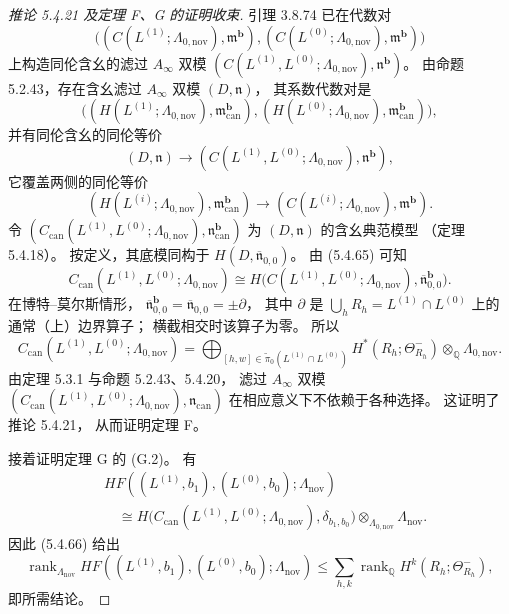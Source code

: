 \begin{proof}[推论 5.4.21 及定理 F、G 的证明收束]
引理 3.8.74 已在代数对
\[
\bigl(
(C(L^{(1)};\Lambda_{0,\mathrm{nov}}),
\mathfrak m^{\mathbf b}),
(C(L^{(0)};\Lambda_{0,\mathrm{nov}}),
\mathfrak m^{\mathbf b})
\bigr)
\]
上构造同伦含幺的滤过 $A_\infty$ 双模
$(C(L^{(1)},L^{(0)};\Lambda_{0,\mathrm{nov}}),
\mathfrak n^{\mathbf b})$。
由命题 5.2.43，存在含幺滤过
$A_\infty$ 双模 $(D,\mathfrak n)$，
其系数代数对是
\[
\bigl(
(H(L^{(1)};\Lambda_{0,\mathrm{nov}}),
\mathfrak m_{\mathrm{can}}^{\mathbf b}),
(H(L^{(0)};\Lambda_{0,\mathrm{nov}}),
\mathfrak m_{\mathrm{can}}^{\mathbf b})
\bigr),
\]
并有同伦含幺的同伦等价
\begin{equation}
(D,\mathfrak n)
\longrightarrow
(C(L^{(1)},L^{(0)};\Lambda_{0,\mathrm{nov}}),
\mathfrak n^{\mathbf b}),
\tag{5.4.65}\label{eq:5-4-65}
\end{equation}
它覆盖两侧的同伦等价
\[
(H(L^{(i)};\Lambda_{0,\mathrm{nov}}),
\mathfrak m_{\mathrm{can}}^{\mathbf b})
\longrightarrow
(C(L^{(i)};\Lambda_{0,\mathrm{nov}}),
\mathfrak m^{\mathbf b}).
\]
令
$(C_{\mathrm{can}}(L^{(1)},L^{(0)};
\Lambda_{0,\mathrm{nov}}),
\mathfrak n_{\mathrm{can}}^{\mathbf b})$
为 $(D,\mathfrak n)$ 的含幺典范模型
（定理 5.4.18）。
按定义，其底模同构于
$H(D,\overline{\mathfrak n}_{0,0})$。
由 (5.4.65) 可知
\[
C_{\mathrm{can}}(L^{(1)},L^{(0)};
\Lambda_{0,\mathrm{nov}})
\cong
H\bigl(
C(L^{(1)},L^{(0)};\Lambda_{0,\mathrm{nov}}),
\overline{\mathfrak n}_{0,0}^{\mathbf b}
\bigr).
\]
在博特--莫尔斯情形，
$\overline{\mathfrak n}_{0,0}^{\mathbf b}
=\overline{\mathfrak n}_{0,0}
=\pm\partial$，
其中 $\partial$ 是
$\bigcup_hR_h=L^{(1)}\cap L^{(0)}$
上的通常（上）边界算子；
横截相交时该算子为零。
所以
\begin{equation}
C_{\mathrm{can}}(L^{(1)},L^{(0)};
\Lambda_{0,\mathrm{nov}})
=
\bigoplus_{[h,w]\in
\widetilde{\pi}_0(L^{(1)}\cap L^{(0)})}
H^*(R_h;\Theta^-_{R_h})
\otimes_{\mathbb Q}\Lambda_{0,\mathrm{nov}}.
\tag{5.4.66}\label{eq:5-4-66}
\end{equation}
由定理 5.3.1 与命题 5.2.43、5.4.20，
滤过 $A_\infty$ 双模
$(C_{\mathrm{can}}(L^{(1)},L^{(0)};
\Lambda_{0,\mathrm{nov}}),
\mathfrak n_{\mathrm{can}})$
在相应意义下不依赖于各种选择。
这证明了推论 5.4.21，
从而证明定理 F。

接着证明定理 G 的 \textup{(G.2)}。
有
\[
\begin{aligned}
&HF((L^{(1)},b_1),(L^{(0)},b_0);
\Lambda_{\mathrm{nov}})\\
&\quad\cong
H\bigl(
C_{\mathrm{can}}(L^{(1)},L^{(0)};
\Lambda_{0,\mathrm{nov}}),
\delta_{b_1,b_0}
\bigr)
\otimes_{\Lambda_{0,\mathrm{nov}}}
\Lambda_{\mathrm{nov}}.
\end{aligned}
\]
因此 (5.4.66) 给出
\[
\operatorname{rank}_{\Lambda_{\mathrm{nov}}}
HF((L^{(1)},b_1),(L^{(0)},b_0);
\Lambda_{\mathrm{nov}})
\le
\sum_{h,k}
\operatorname{rank}_{\mathbb Q}
H^k(R_h;\Theta^-_{R_h}),
\]
即所需结论。
\end{proof}

